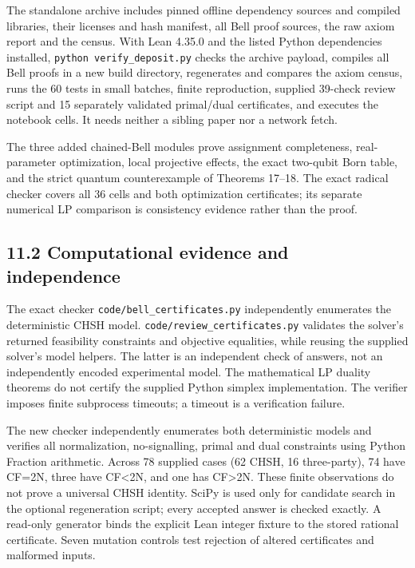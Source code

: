 \documentclass[
]{article}
\begin{document}
The standalone archive includes pinned offline dependency sources and compiled libraries, their licenses and hash manifest, all Bell proof sources, the raw axiom report and the census. With Lean 4.35.0 and the listed Python dependencies installed, \texttt{python\ verify\_deposit.py} checks the archive payload, compiles all Bell proofs in a new build directory, regenerates and compares the axiom census, runs the 60 tests in small batches, finite reproduction, supplied 39-check review script and 15 separately validated primal/dual certificates, and executes the notebook cells. It needs neither a sibling paper nor a network fetch.

The three added chained-Bell modules prove assignment completeness, real-parameter optimization, local projective effects, the exact two-qubit Born table, and the strict quantum counterexample of Theorems 17--18. The exact radical checker covers all 36 cells and both optimization certificates; its separate numerical LP comparison is consistency evidence rather than the proof.

\subsection{11.2 Computational evidence and independence}\label{computational-evidence-and-independence}

The exact checker \texttt{code/bell\_certificates.py} independently enumerates the deterministic CHSH model. \texttt{code/review\_certificates.py} validates the solver's returned feasibility constraints and objective equalities, while reusing the supplied solver's model helpers. The latter is an independent check of answers, not an independently encoded experimental model. The mathematical LP duality theorems do not certify the supplied Python simplex implementation. The verifier imposes finite subprocess timeouts; a timeout is a verification failure.

The new checker independently enumerates both deterministic models and verifies all normalization, no-signalling, primal and dual constraints using Python Fraction arithmetic. Across 78 supplied cases (62 CHSH, 16 three-party), 74 have CF=2N, three have CF\textless2N, and one has CF\textgreater2N. These finite observations do not prove a universal CHSH identity. SciPy is used only for candidate search in the optional regeneration script; every accepted answer is checked exactly. A read-only generator binds the explicit Lean integer fixture to the stored rational certificate. Seven mutation controls test rejection of altered certificates and malformed inputs.
\end{document}
